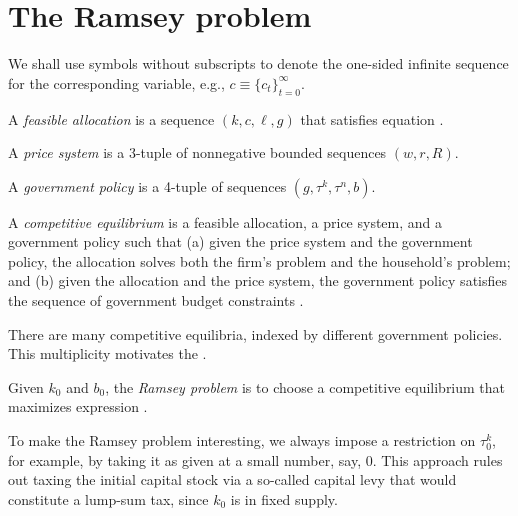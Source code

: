 \section{The Ramsey problem}
 We shall use symbols without subscripts to denote
the one-sided infinite sequence for the corresponding variable,
e.g., $c \equiv \{c_t\}_{t=0}^\infty$.

\medskip{} A {\it feasible allocation} is a sequence
$(k, c, \ell, g)$ that satisfies equation .

\medskip{}  A {\it price system}
is a 3-tuple of nonnegative bounded sequences $(w,r,R)$.

\medskip{}  A {\it government policy}
is a 4-tuple of sequences $(g, \tau^k, \tau^n, b)$.

\medskip{} A {\it competitive equilibrium}
is a feasible allocation, a price system, and a government policy
such that  (a) given the price system and the government policy,
the allocation solves both the firm's  problem and the household's problem;
and  (b) given the allocation and the price system,
the government policy   satisfies the sequence of  government
budget constraints .

\medskip

There are many competitive equilibria, indexed by
different government policies.  This multiplicity  motivates the
.

\medskip{}  Given $k_0$ and $b_0$, the {\it Ramsey problem\/} is
to choose a competitive equilibrium that maximizes expression
.

\medskip

To make the Ramsey problem interesting, we always impose a restriction
on $\tau^k_{0}$, for example, by taking it as given at a small
number, say, $0$.  This approach rules out taxing the initial capital stock
via a so-called capital levy that would constitute a lump-sum tax, since
$k_0$ is in fixed supply.%


